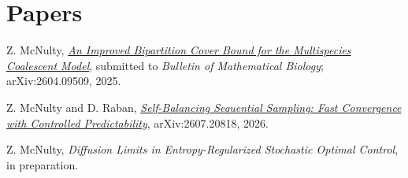 \section{\sc Papers}

Z. McNulty, \href{https://arxiv.org/abs/2604.09509}{\textit{An Improved Bipartition Cover Bound for the Multispecies Coalescent Model}}, submitted to \textit{Bulletin of Mathematical Biology}; arXiv:2604.09509, 2025.

Z. McNulty and D. Raban, \href{https://arxiv.org/abs/2607.20818}{\textit{Self-Balancing Sequential Sampling: Fast Convergence with Controlled Predictability}}, arXiv:2607.20818, 2026.

Z. McNulty, \textit{Diffusion Limits in Entropy-Regularized Stochastic Optimal Control}, in preparation.

\endinput
